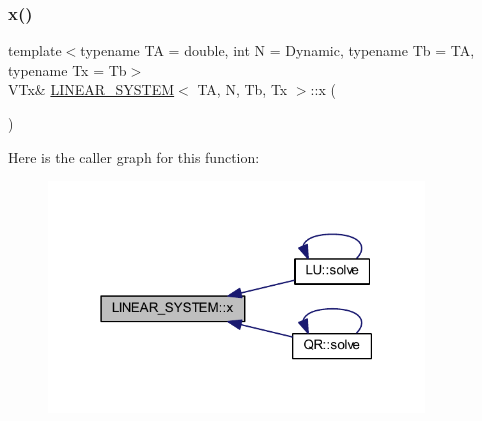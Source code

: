 \mbox{\label{class_l_i_n_e_a_r___s_y_s_t_e_m_a0585adb67fae39d29e887d03d071fc74}} 
\subsubsection{\texorpdfstring{x()}{x()}\hspace{0.1cm}{\footnotesize\ttfamily [1/2]}}
{\footnotesize\ttfamily template$<$typename TA = double, int N = Dynamic, typename Tb = TA, typename Tx = Tb$>$ \\
V\+Tx\& \mbox{\hyperlink{class_l_i_n_e_a_r___s_y_s_t_e_m}{L\+I\+N\+E\+A\+R\+\_\+\+S\+Y\+S\+T\+EM}}$<$ TA, N, Tb, Tx $>$\+::x (\begin{DoxyParamCaption}{ }\end{DoxyParamCaption})\hspace{0.3cm}{\ttfamily [inline]}}

Here is the caller graph for this function\+:\nopagebreak
\begin{figure}[H]
\begin{center}
\leavevmode
\includegraphics[width=283pt]{class_l_i_n_e_a_r___s_y_s_t_e_m_a0585adb67fae39d29e887d03d071fc74_icgraph}
\end{center}
\end{figure}
\mbox{\label{class_l_i_n_e_a_r___s_y_s_t_e_m_ad00a0cae1d479dd527cc374c210b9429}} 
